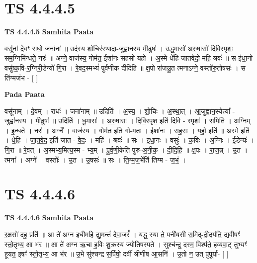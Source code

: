 \documentclass[17pt]{extarticle}
\begin{document}
\section*{ TS 4.4.4.5 }

\textbf{TS 4.4.4.5 } \newline
\textbf{Samhita Paata} \newline

वसू॑नां दे॒वꣳ राधो॒ जना॑नां ॥ उद॑स्य शो॒चिर॑स्थादा॒-जुह्वा॑नस्य मी॒ढुषः॑ । उद्ध॒मासो॑ अरु॒षासो॑ दिवि॒स्पृशः॒ सम॒ग्निमि॑न्धते॒ नरः॑ ॥ अग्ने॒ वाज॑स्य॒ गोम॑त॒ ईशा॑नः सहसो यहो । अ॒स्मे धे॑हि जातवेदो॒ महि॒ श्रवः॑ ॥ स इ॑धा॒नो वसु॑ष्क॒वि-र॒ग्निरी॒डेन्यो॑ गि॒रा । रे॒वद॒स्मभ्यं॑ पुर्वणीक दीदिहि ॥ क्ष॒पो रा॑जन्नु॒त त्मनाऽग्ने॒ वस्तो॑रु॒तोषसः॑ । स ति॑ग्मजंभ - [  ] \newline

\textbf{Pada Paata} \newline

वसू॑नाम् । दे॒वम् । राधः॑ । जना॑नाम् ॥ उदिति॑ । अ॒स्य॒ । शो॒चिः । अ॒स्था॒त् । आ॒जुह्वा॑न॒स्येत्या᳚ - जुह्वा॑नस्य । मी॒ढुषः॑ ॥ उदिति॑ । धू॒मासः॑ । अ॒रु॒षासः॑ । दि॒वि॒स्पृश॒ इति॑ दिवि - स्पृशः॑ । समिति॑ । अ॒ग्निम् । इ॒न्ध॒ते॒ । नरः॑ ॥ अग्ने᳚ । वाज॑स्य । गोम॑त॒ इति॒ गो-म॒तः॒ । ईशा॑नः । स॒ह॒सः॒ । य॒हो॒ इति॑ ॥ अ॒स्मे इति॑ । धे॒हि॒ । जा॒त॒वे॒द॒ इति॑ जात - वे॒दः॒ । महि॑ । श्रवः॑ ॥ सः । इ॒धा॒नः । वसुः॑ । क॒विः । अ॒ग्निः । ई॒डेन्यः॑ । गि॒रा ॥ रे॒वत् । अ॒स्मभ्य॒मित्य॒स्म - भ्य॒म् । पु॒र्व॒णी॒केति॑ पुरु-अ॒नी॒क॒ । दी॒दि॒हि॒ ॥ क्ष॒पः । रा॒ज॒न्न् । उ॒त । त्मना᳚ । अग्ने᳚ । वस्तोः᳚ । उ॒त । उ॒षसः॑ ॥ सः । ति॒ग्म॒ज॒भेंति॑ तिग्म - ज॒भं॒ ।  \newline




\section*{ TS 4.4.4.6 }

\textbf{TS 4.4.4.6 } \newline
\textbf{Samhita Paata} \newline

र॒क्षसो॑ दह॒ प्रति॑ ॥ आ ते॑ अग्न इधीमहि द्यु॒मन्तं॑ देवा॒जरं᳚ । यद्ध॒ स्या ते॒ पनी॑यसी स॒मिद्-दी॒दय॑ति॒ द्यवीषꣳ॑ स्तो॒तृभ्य॒ आ भ॑र ॥ आ ते॑ अग्न ऋ॒चा ह॒विः शु॒क्रस्य॑ ज्योतिषस्पते । सुश्च॑न्द्र॒ दस्म॒ विश्प॑ते॒ हव्य॑वा॒ट् तुभ्यꣳ॑ हूयत॒ इषꣳ॑ स्तो॒तृभ्य॒ आ भ॑र ॥ उ॒भे सु॑श्चन्द्र स॒र्पिषो॒ दर्वी᳚ श्रीणीष आ॒सनि॑ । उ॒तो न॒ उत् पु॑पूर्या- [  ] \newline
\end{document}

